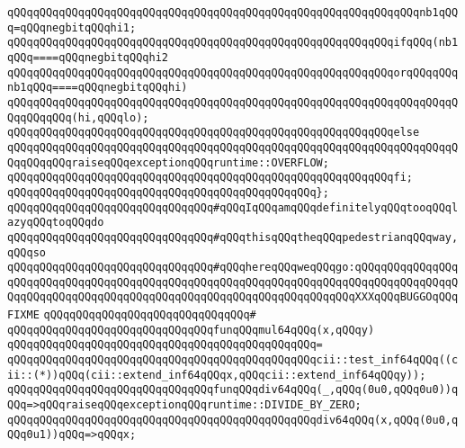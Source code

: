 \verb|qQQqqQQqqQQqqQQqqQQqqQQqqQQqqQQqqQQqqQQqqQQqqQQqqQQqqQQqqQQqqQQqnb1qQQq=qQQqnegbitqQQqhi1;|\newline
\newline
\verb|qQQqqQQqqQQqqQQqqQQqqQQqqQQqqQQqqQQqqQQqqQQqqQQqqQQqqQQqqQQqifqQQq(nb1qQQq====qQQqnegbitqQQqhi2|\newline
\verb|qQQqqQQqqQQqqQQqqQQqqQQqqQQqqQQqqQQqqQQqqQQqqQQqqQQqqQQqqQQqorqQQqqQQqnb1qQQq====qQQqnegbitqQQqhi)|\newline
\verb|qQQqqQQqqQQqqQQqqQQqqQQqqQQqqQQqqQQqqQQqqQQqqQQqqQQqqQQqqQQqqQQqqQQqqQQqqQQqqQQq(hi,qQQqlo);|\newline
\verb|qQQqqQQqqQQqqQQqqQQqqQQqqQQqqQQqqQQqqQQqqQQqqQQqqQQqqQQqqQQqelse|\newline
\verb|qQQqqQQqqQQqqQQqqQQqqQQqqQQqqQQqqQQqqQQqqQQqqQQqqQQqqQQqqQQqqQQqqQQqqQQqqQQqqQQqraiseqQQqexceptionqQQqruntime::OVERFLOW;|\newline
\verb|qQQqqQQqqQQqqQQqqQQqqQQqqQQqqQQqqQQqqQQqqQQqqQQqqQQqqQQqqQQqfi;|\newline
\verb|qQQqqQQqqQQqqQQqqQQqqQQqqQQqqQQqqQQqqQQqqQQqqQQq};|\newline
\newline
\verb|qQQqqQQqqQQqqQQqqQQqqQQqqQQqqQQq#qQQqIqQQqamqQQqdefinitelyqQQqtooqQQqlazyqQQqtoqQQqdo|\newline
\verb|qQQqqQQqqQQqqQQqqQQqqQQqqQQqqQQq#qQQqthisqQQqtheqQQqpedestrianqQQqway,qQQqso|\newline
\verb|qQQqqQQqqQQqqQQqqQQqqQQqqQQqqQQq#qQQqhereqQQqweqQQqgo:qQQqqQQqqQQqqQQqqQQqqQQqqQQqqQQqqQQqqQQqqQQqqQQqqQQqqQQqqQQqqQQqqQQqqQQqqQQqqQQqqQQqqQQqqQQqqQQqqQQqqQQqqQQqqQQqqQQqqQQqqQQqqQQqqQQqqQQqqQQqXXXqQQqBUGGOqQQqFIXME|\newline
\verb|qQQqqQQqqQQqqQQqqQQqqQQqqQQqqQQq#|\newline
\verb|qQQqqQQqqQQqqQQqqQQqqQQqqQQqqQQqfunqQQqmul64qQQq(x,qQQqy)|\newline
\verb|qQQqqQQqqQQqqQQqqQQqqQQqqQQqqQQqqQQqqQQqqQQqqQQq=|\newline
\verb|qQQqqQQqqQQqqQQqqQQqqQQqqQQqqQQqqQQqqQQqqQQqqQQqcii::test_inf64qQQq((cii::(*))qQQq(cii::extend_inf64qQQqx,qQQqcii::extend_inf64qQQqy));|\newline
\newline
\verb|qQQqqQQqqQQqqQQqqQQqqQQqqQQqqQQqfunqQQqdiv64qQQq(_,qQQq(0u0,qQQq0u0))qQQq=>qQQqraiseqQQqexceptionqQQqruntime::DIVIDE_BY_ZERO;|\newline
\verb|qQQqqQQqqQQqqQQqqQQqqQQqqQQqqQQqqQQqqQQqqQQqqQQqdiv64qQQq(x,qQQq(0u0,qQQq0u1))qQQq=>qQQqx;|\newline
